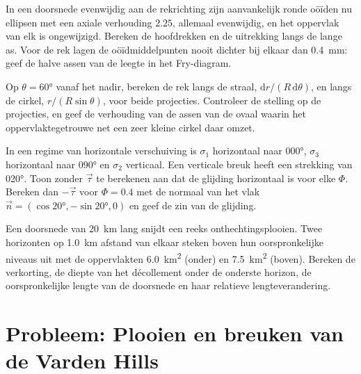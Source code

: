 \begin{exercise}[$\star\star$]\label{exo:b3:structural-analysis:9}
In een doorsnede evenwijdig aan de rekrichting zijn aanvankelijk ronde oöïden
nu ellipsen met een axiale verhouding $2.25$, allemaal evenwijdig, en het oppervlak van elk
is ongewijzigd. Bereken de hoofdrekken en de uitrekking langs de lange
as. Voor de rek lagen de oöïdmiddelpunten nooit dichter bij elkaar dan
\qty{0.4}{mm}: geef de halve assen van de leegte in het Fry-diagram.
\end{exercise}

\begin{exercise}[$\star\star\star$]\label{exo:b3:structural-analysis:10}
Op $\theta = \ang{60}$ vanaf het nadir, bereken de rek langs de straal,
$\mathrm dr/(R\,\mathrm d\theta)$, en langs de cirkel, $r/(R\sin\theta)$,
voor beide projecties. Controleer de stelling op de projecties, en geef de verhouding
van de assen van de ovaal waarin het oppervlaktegetrouwe net een zeer kleine
cirkel daar omzet.
\end{exercise}

\begin{exercise}[$\star\star\star$]\label{exo:b3:structural-analysis:11}
In een regime van horizontale verschuiving is $\sigma_1$ horizontaal naar \ang{000},
$\sigma_3$ horizontaal naar \ang{090} en $\sigma_2$ verticaal. Een verticale
breuk heeft een strekking van \ang{020}. Toon zonder $\vec\tau$ te berekenen aan dat de glijding
horizontaal is voor elke $\Phi$. Bereken dan $-\vec\tau$ voor $\Phi = 0.4$ met de
normaal van het vlak $\vec n = (\cos\ang{20}, -\sin\ang{20}, 0)$ en geef de
zin van de glijding.
\end{exercise}

\begin{exercise}[$\star\star\star$]\label{exo:b3:structural-analysis:12}
Een doorsnede van \qty{20}{km} lang snijdt een reeks onthechtingsplooien. Twee horizonten
op \qty{1.0}{km} afstand van elkaar steken boven hun oorspronkelijke niveaus uit met de oppervlakten
\qty{6.0}{km^2} (onder) en \qty{7.5}{km^2} (boven). Bereken de verkorting,
de diepte van het décollement onder de onderste horizon, de oorspronkelijke lengte van
de doorsnede en haar relatieve lengteverandering.
\end{exercise}

\section{Probleem: Plooien en breuken van de Varden Hills}

